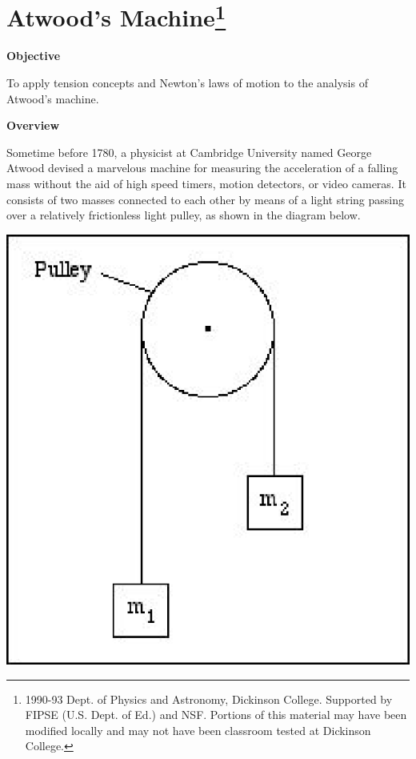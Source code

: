 
\section{Atwood's Machine\footnote{
1990-93 Dept. of Physics and Astronomy, Dickinson College. Supported by FIPSE
(U.S. Dept. of Ed.) and NSF. Portions of this material may have been modified
locally and may not have been classroom tested at Dickinson College.
}}

\makelabheader %

\textbf{Objective }

To apply tension concepts and Newton's laws of motion to the analysis of Atwood's
machine.

\textbf{Overview }

Sometime before 1780, a physicist at Cambridge University named George Atwood
devised a marvelous machine for measuring the acceleration of a falling mass
without the aid of high speed timers, motion detectors, or video cameras. It
consists of two masses connected to each other by means of a light string passing
over a relatively frictionless light pulley, as shown in the diagram below.

\vspace{0.3cm}
{\par\centering \includegraphics{atwood/atwood_fig1.eps} \par}
\vspace{0.3cm}

